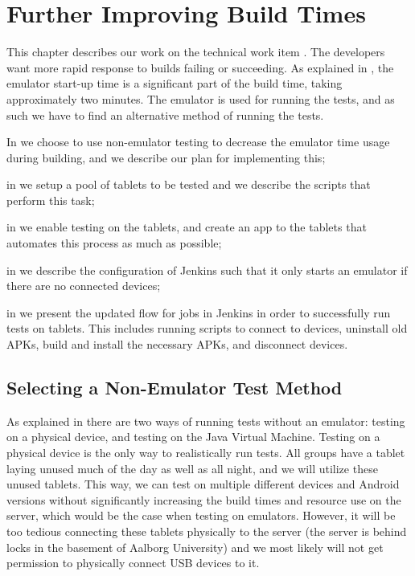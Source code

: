 \chapter{Further Improving Build Times}
This chapter describes our work on the technical work item . The developers want more rapid response to builds failing or succeeding. As explained in , the emulator start-up time is a significant part of the build time, taking approximately two minutes. The emulator is used for running the tests, and as such we have to find an alternative method of running the tests.

\begin{chapterorganization}
  \item In  we choose to use non-emulator testing to decrease the emulator time usage during building, and we describe our plan for implementing this;
  \item in  we setup a pool of tablets to be tested and we describe the scripts that perform this task;
  \item in  we enable testing on the tablets, and create an app to the tablets that automates this process as much as possible;
  \item in  we describe the configuration of Jenkins such that it only starts an emulator if there are no connected devices;
  \item in  we present the updated flow for jobs in Jenkins in order to successfully run tests on tablets. This includes running scripts to connect to devices, uninstall old APKs, build and install the necessary APKs, and disconnect devices.
\end{chapterorganization}

\section{Selecting a Non-Emulator Test Method}\label{sec:selecting_nonemu_method}
As explained in  there are two ways of running tests without an emulator: testing on a physical device, and testing on the Java Virtual Machine. Testing on a physical device is the only way to realistically run tests. All groups have a tablet laying unused much of the day as well as all night, and we will utilize these unused tablets. This way, we can test on multiple different devices and Android versions without significantly increasing the build times and resource use on the server, which would be the case when testing on emulators. However, it will be too tedious connecting these tablets physically to the server (the server is behind locks in the basement of Aalborg University) and we most likely will not get permission to physically connect USB devices to it.

